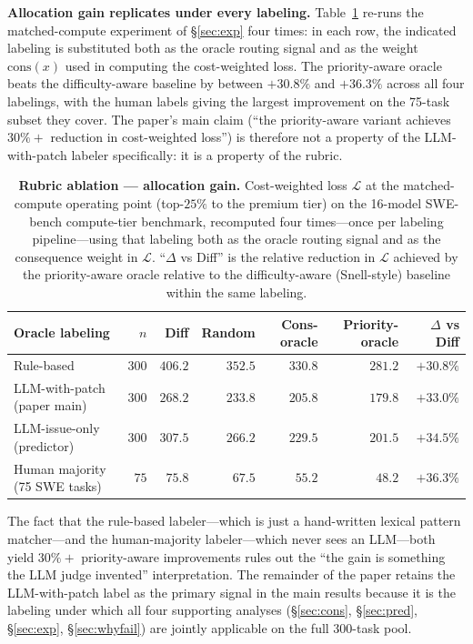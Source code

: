 \documentclass{article}
\begin{document}
\textbf{Allocation gain replicates under every labeling.}
Table~\ref{tab:abl-gain} re-runs the matched-compute experiment of
\S\ref{sec:exp} four times: in each row, the indicated labeling is
substituted both as the oracle routing signal and as the weight
$\mathrm{cons}(x)$ used in computing the cost-weighted loss. The
priority-aware oracle beats the difficulty-aware baseline by between
$+30.8\%$ and $+36.3\%$ across all four labelings, with the human
labels giving the largest improvement on the 75-task subset they
cover. The paper's main claim (``the priority-aware variant achieves
$30\%+$ reduction in cost-weighted loss'') is therefore not a
property of the LLM-with-patch labeler specifically: it is a property
of the rubric.

\begin{table}[h]
\centering
\caption{\textbf{Rubric ablation — allocation gain.} Cost-weighted loss
$\mathcal{L}$ at the matched-compute operating point (top-$25\%$ to
the premium tier) on the 16-model SWE-bench compute-tier benchmark,
recomputed four times---once per labeling pipeline---using that
labeling both as the oracle routing signal and as the consequence
weight in $\mathcal{L}$. ``$\Delta$ vs Diff'' is the relative
reduction in $\mathcal{L}$ achieved by the priority-aware oracle
relative to the difficulty-aware (Snell-style) baseline within the
same labeling.}
\label{tab:abl-gain}
\small
\begin{tabular}{lrrrrrr}
\toprule
Oracle labeling & $n$ & Diff & Random & Cons-oracle & Priority-oracle & $\Delta$ vs Diff \\
\midrule
Rule-based                                & $300$ & $406.2$ & $352.5$ & $330.8$ & $\mathbf{281.2}$ & $+30.8\%$ \\
LLM-with-patch (paper main)        & $300$ & $268.2$ & $233.8$ & $205.8$ & $\mathbf{179.8}$ & $+33.0\%$ \\
LLM-issue-only (predictor)         & $300$ & $307.5$ & $266.2$ & $229.5$ & $\mathbf{201.5}$ & $+34.5\%$ \\
Human majority (75 SWE tasks)      & $\phantom{0}75$  & $\phantom{0}75.8$  & $\phantom{0}67.5$  & $\phantom{0}55.2$  & $\phantom{00}\mathbf{48.2}$  & $+36.3\%$ \\
\bottomrule
\end{tabular}
\end{table}

The fact that the rule-based labeler---which is just a hand-written
lexical pattern matcher---and the human-majority labeler---which never
sees an LLM---both yield $30\%+$ priority-aware improvements rules
out the ``the gain is something the LLM judge invented'' interpretation. The
remainder of the paper retains the LLM-with-patch label as the
primary signal in the main results because it is the labeling under
which all four supporting analyses
(\S\ref{sec:cons}, \S\ref{sec:pred}, \S\ref{sec:exp}, \S\ref{sec:whyfail})
are jointly applicable on the full 300-task pool.
\end{document}
